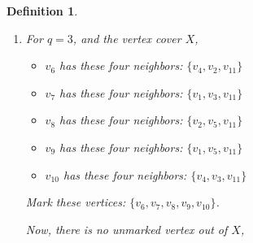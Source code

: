 \documentclass[12pt]{article}
\theoremstyle{slplain}
\newtheorem{defi}{Definition}
\begin{document}
\begin{defi}
\begin{enumerate}
This kernel can be colored with $3$ and therefore with $4$ colors.

\vspace{1cm}

\begin{center}
\end{center}
\vspace{1cm}


If we consider set $Y$ as vertex cover, then only vertex $v_7$ is out of $Y$ and it doesn't have 4 neighbors in $Y$, hence no 
vertex will be marked and just $v_7$ will be removed, then the kernel is the set 
$\{v_1 , v_2 , v_3 , v_4 , v_5 , v_6 , v_8 , v_9 , v_{10} , v_{11}\}$ which is not good, because the kernel is not small enough.

\item For $q = 3$, and the vertex cover $X$,


\begin{itemize}
\item $v_6$ has these four neighbors: $\{v_4 , v_2 , v_{11}\}$

\item $v_7$ has these four neighbors: $\{v_1 , v_3 , v_{11}\}$

\item $v_8$ has these four neighbors: $\{v_2 , v_5 , v_{11}\}$ 

\item $v_9$ has these four neighbors: $\{v_1 , v_5 , v_{11}\}$

\item $v_{10}$ has these four neighbors: $\{v_4 , v_3 , v_{11}\}$ 
\end{itemize}

Mark these vertices: $\{v_6, v_7, v_8, v_9, v_{10}\}$.


Now, there is no unmarked vertex out of $X$,


\end{enumerate}
\end{defi}
\end{document}
